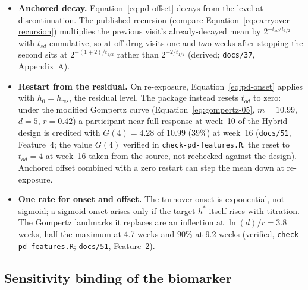 \documentclass[11pt]{article}
\newcommand{\code}[1]{\texttt{#1}}
\begin{document}
\begin{itemize}[itemsep=1pt]
\item \textbf{Anchored decay.} Equation~\eqref{eq:pd-offset} decays
  from the level at discontinuation. The published recursion (compare
  Equation~\eqref{eq:carryover-recursion}) multiplies the previous
  visit's already-decayed mean by $2^{-t_{sd}/t_{1/2}}$ with $t_{sd}$
  cumulative, so at off-drug visits one and two weeks after stopping
  the second sits at $2^{-(1+2)/t_{1/2}}$ rather than $2^{-2/t_{1/2}}$
  (derived; \code{docs/37}, Appendix~A).
\item \textbf{Restart from the residual.} On re-exposure,
  Equation~\eqref{eq:pd-onset} applies with $h_0 = h_{\text{res}}$,
  the residual level. The package instead resets $t_{od}$ to zero:
  under the modified Gompertz curve (Equation~\eqref{eq:gompertz-05},
  $m = 10.99$, $d = 5$, $r = 0.42$)
  a participant near full response at week~10 of the Hybrid design is
  credited with $G(4) = 4.28$ of $10.99$ (39\%) at week~16
  (\code{docs/51}, Feature~4; the value $G(4)$ verified in
  \code{check-pd-features.R}, the reset to $t_{od} = 4$ at week~16 taken
  from the source, not rechecked against the design). Anchored offset
  combined with a zero restart can step the mean down at re-exposure.
\item \textbf{One rate for onset and offset.} The turnover onset is
  exponential, not sigmoid; a sigmoid onset arises only if the target
  $h^{\ast}$ itself rises with titration. The Gompertz landmarks it
  replaces are an inflection at $\ln(d)/r =
  3.8$ weeks, half the maximum at 4.7 weeks and 90\% at 9.2 weeks
  (verified, \code{check-pd-features.R}; \code{docs/51}, Feature~2).
\end{itemize}

\subsection{Sensitivity binding of the biomarker}
\end{document}
